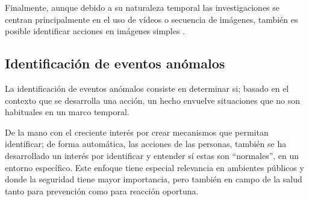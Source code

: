         Finalmente, aunque debido a su naturaleza temporal las investigaciones se centran principalmente en el uso de vídeos o secuencia de imágenes, también es posible identificar acciones en imágenes simples \cite{Guo2014, Rojas2019heart}.
    
    \subsection{Identificación de eventos anómalos}
    \label{sub:FrameAnomalousEventDetect}
        La identificación de eventos anómalos consiste en determinar si; basado en el contexto que se desarrolla una acción, un hecho envuelve situaciones que no son habituales en un marco temporal.

        De la mano con el creciente interés por crear mecanismos que permitan identificar; de forma automática, las acciones de las personas, también se ha desarrollado un interés por identificar y entender sí estas son “normales”, en un entorno específico. Este enfoque tiene especial relevancia en ambientes públicos y donde la seguridad tiene mayor importancia, pero también en campo de la salud tanto para prevención como para reacción oportuna.
        
        
        
        

        

